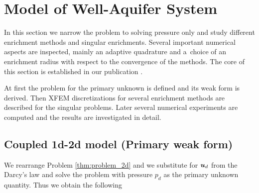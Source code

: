 \section{Model of Well-Aquifer System} 
\label{sec:model_aquifer}
In this section we narrow the problem to solving pressure only and study different enrichment methods and singular enrichments.
Several important numerical aspects are inspected, mainly an adaptive quadrature and
a~choice of an enrichment radius with respect to the convergence of the methods.
The core of this section is established in our publication \cite{exner_2016}.

At first the problem for the primary unknown is defined and its weak form is derived. Then
XFEM discretizations for several enrichment methods are described for the singular problems.
Later several numerical experiments are computed and the results are investigated in detail.


\subsection{Coupled 1d-2d model (Primary weak form)}
\label{sec:primary_form}

We rearrange Problem \ref{thm:problem_2d} and we substitute for $\mathbf{\boldsymbol{u}}_d$ from the Darcy's law and solve the problem
with pressure $p_d$ as the primary unknown quantity. Thus we obtain the following


